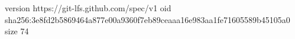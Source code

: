 version https://git-lfs.github.com/spec/v1
oid sha256:3e8fd2b5869464a877e00a9360f7eb89ceaaa16e983aa1fe71605589b45105a0
size 74
